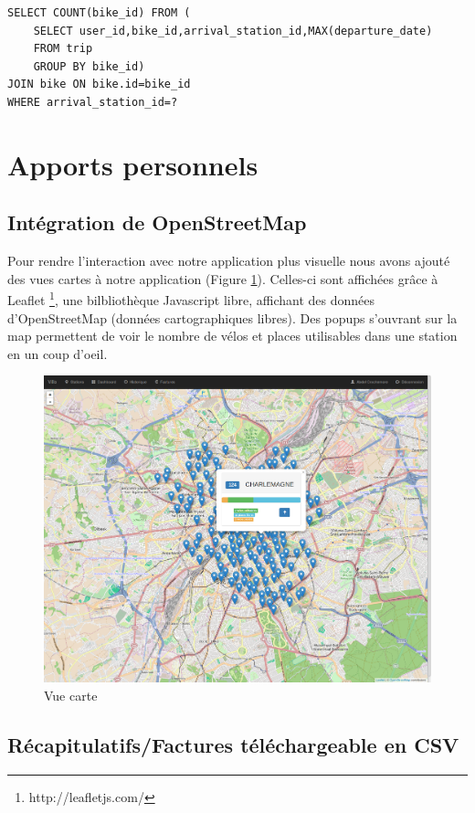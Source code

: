\documentclass[a4paper,10pt]{article}
\begin{document}
\begin{lstlisting}
SELECT COUNT(bike_id) FROM (
    SELECT user_id,bike_id,arrival_station_id,MAX(departure_date)
    FROM trip
    GROUP BY bike_id) 
JOIN bike ON bike.id=bike_id 
WHERE arrival_station_id=?
\end{lstlisting}


\section{Apports personnels}

\subsection{Intégration de OpenStreetMap}
Pour rendre l'interaction avec notre application plus visuelle nous avons ajouté
des vues cartes à notre application (Figure \ref{fig:map}). Celles-ci sont affichées grâce à Leaflet
\footnote{http://leafletjs.com/}, une bilbliothèque Javascript libre, affichant
des données d'OpenStreetMap (données cartographiques libres). Des popups
s'ouvrant sur la map permettent de voir le nombre de vélos et places utilisables
dans une station en un coup d'oeil.

\begin{figure}[H]
  \centering
  \includegraphics[scale=0.2]{map.png}
  \caption{\label{fig:map} Vue carte}
\end{figure}

\subsection{Récapitulatifs/Factures téléchargeable en CSV} %
\end{document}
